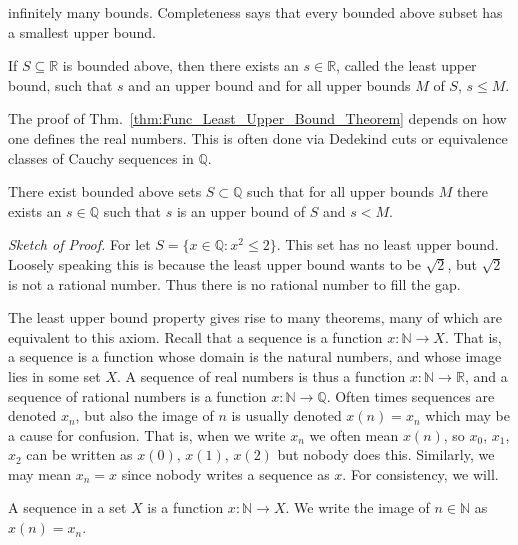        infinitely many bounds. Completeness says that every bounded above
        subset has a smallest upper bound.
        \begin{theorem}
            \label{thm:Func_Least_Upper_Bound_Theorem}%
            If $S\subseteq{\mathbb{R}}$ is bounded above, then there exists an
            $s\in\mathbb{R}$, called the least upper bound, such that $s$
            and an upper bound and for all upper bounds $M$ of $S$, $s\leq{M}$.
        \end{theorem}
        The proof of Thm.~\ref{thm:Func_Least_Upper_Bound_Theorem} depends on
        how one defines the real numbers. This is often done via Dedekind cuts
        or equivalence classes of Cauchy sequences in $\mathbb{Q}$.
        \begin{theorem}
            There exist bounded above sets
            $S\subset\mathbb{Q}$ such that for all
            upper bounds $M$ there exists an
            $s\in\mathbb{Q}$ such that $s$ is an upper
            bound of $S$ and $s<M$.
        \end{theorem}
        \textit{Sketch of Proof.}
        For let $S=\{x\in\mathbb{Q}:x^{2}\leq{2}\}$.
        This set has no least upper bound. Loosely
        speaking this is because the
        least upper bound wants to be $\sqrt{2}$,
        but $\sqrt{2}$ is not a rational number. Thus
        there is no rational number to fill the gap.
        \par\hfill\par
        The least upper bound property gives rise
        to many theorems, many of which are equivalent
        to this axiom. Recall that a sequence is a
        function $x:\mathbb{N}\rightarrow{X}$. That is,
        a sequence is a function whose domain is the
        natural numbers, and whose image lies in some
        set $X$. A sequence of real numbers is thus a
        function $x:\mathbb{N}\rightarrow\mathbb{R}$,
        and a sequence of rational numbers is a function
        $x:\mathbb{N}\rightarrow\mathbb{Q}$.
        Often times sequences are denoted $x_{n}$,
        but also the image of $n$ is usually
        denoted $x(n)=x_{n}$ which may be a cause
        for confusion. That is, when we write $x_{n}$
        we often mean $x(n)$, so $x_{0}$, $x_{1}$,
        $x_{2}$ can be written as $x(0)$, $x(1)$,
        $x(2)$ but nobody does this. Similarly,
        we may mean $x_{n}=x$ since nobody writes
        a sequence as $x$. For consistency, we will.
        \begin{definition}
            A sequence in a set $X$ is a function
            $x:\mathbb{N}\rightarrow{X}$.
            We write the image of $n\in\mathbb{N}$
            as $x(n)=x_{n}$.
        \end{definition}
